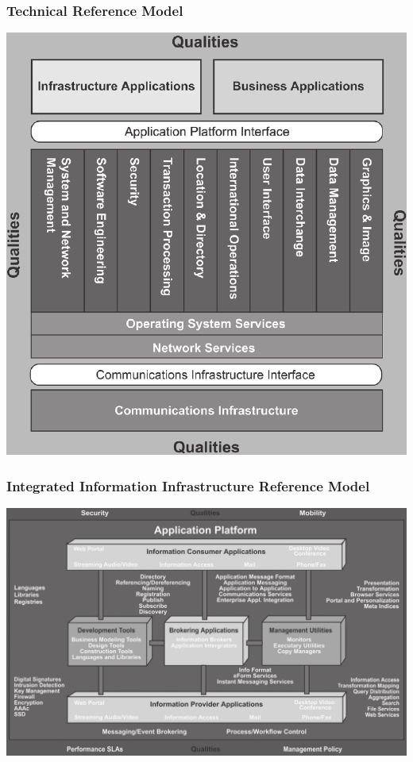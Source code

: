 \documentclass{beamer}
\begin{document}
	{
		\begin{frame}
			\frametitle{Technical Reference Model}
			\begin{center}
				\includegraphics[width=.70\textwidth]{../figures/detailed_technical_reference_model}
			\end{center}
		\end{frame}
	}
	
	{
		\begin{frame}
			\frametitle{Integrated Information Infrastructure Reference Model}
			\begin{center}
				\includegraphics[width=\textwidth]{../figures/integrated_information_infrastructure_reference_model}
			\end{center}
		\end{frame}
	}
	
\end{document}
